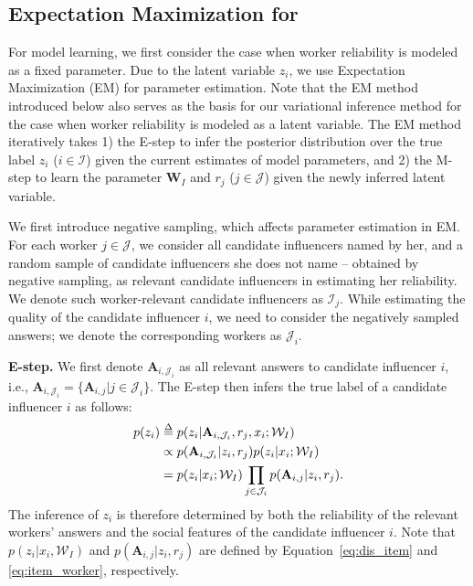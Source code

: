 \subsection{Expectation Maximization for \sys} 
\label{sec:em}
For model learning, we first consider the case when worker reliability is modeled as a fixed parameter. Due to the latent variable $z_i$, we use Expectation Maximization (EM) \cite{dempster1977maximum} for parameter estimation. Note that the EM method introduced below also serves as the basis for our variational inference method for the case when worker reliability is modeled as a latent variable. The EM method iteratively takes 1) the E-step to infer the posterior distribution over the true label $z_i$ ($i\in \mathcal{I}$) given the current estimates of model parameters, and 2) the M-step to learn the parameter $\mathbf{W}_I$ and $r_j$ ($j\in \mathcal{J}$) given the newly inferred latent variable.

We first introduce negative sampling, which affects parameter estimation in EM. For each worker $j\in \mathcal{J}$, we consider all candidate influencers named by her, and a random sample of candidate influencers she does not name -- obtained by negative sampling, as relevant candidate influencers in estimating her reliability. We denote such worker-relevant candidate influencers as $\mathcal{I}_j$. While estimating the quality of the candidate influencer $i$, we need to consider the negatively sampled answers; we denote the corresponding workers as $\mathcal{J}_i$. 

\smallskip
\noindent\textbf{E-step.} We first denote $\mathbf{A}_{i,\mathcal{J}_i}$ as all relevant answers to candidate influencer $i$, i.e., $\mathbf{A}_{i,\mathcal{J}_i} = \{\mathbf{A}_{i,j}|j \in \mathcal{J}_i\}$. The E-step then infers the true label of a candidate influencer $i$ as follows:
%
\begin{align}
    p(z_i) & \delequal p(z_i|\mathbf{A}_{i,\mathcal{J}_i},r_{j},x_i;\mathcal{W}_I) \nonumber\\
        &\propto p(\mathbf{A}_{i,\mathcal{J}_i}|z_i,r_j) p(z_i|x_i;\mathcal{W}_I) \label{eq:dist_cond}\\
        &=p(z_i|x_i;\mathcal{W}_I) \prod_{j \in \mathcal{J}_i} p(\mathbf{A}_{i,j}|z_i,r_{j}). \nonumber    
\end{align}
%
The inference of $z_i$ is therefore determined by both the reliability of the relevant workers' answers and the social features of the candidate influencer $i$. Note that $p(z_i|x_i,\mathcal{W}_I)$ and $p(\mathbf{A}_{i,j}|z_i,r_{j})$ are defined by Equation~\ref{eq:dis_item} and \ref{eq:item_worker}, respectively.

